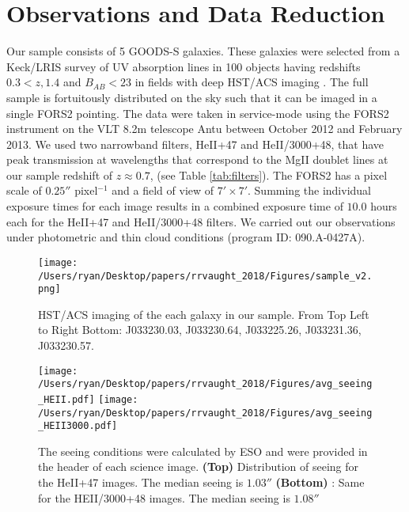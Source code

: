 \documentclass[twocolumn]{aastex6}
\begin{document}
\section{Observations and Data Reduction}
Our sample consists of 5 GOODS-S galaxies. These galaxies were selected from a Keck/LRIS survey of UV absorption lines in 100 objects having redshifts $0.3< z , 1.4$ and $B_{AB}< 23$ in fields with deep HST/ACS imaging \cite{Rubin_2014}. 
%
The full sample is fortuitously distributed on the sky such that it can be imaged in a single FORS2 pointing.
The data were taken in service-mode using the FORS2 instrument on the VLT 8.2m telescope Antu between October 2012 and February 2013. 
%
We used two narrowband filters, HeII+47 and HeII/3000+48, that have peak transmission at wavelengths that correspond to the MgII doublet lines at our sample redshift of $z\approx 0.7$, (see Table \ref{tab:filters}).
%
The FORS2 has a pixel scale of $0.25''$ pixel$^{-1}$ and a field of view of $7'\times7'$.
%
Summing the individual exposure times for each image results in a combined exposure time of $10.0$ hours each for the HeII+47 and HeII/3000+48 filters.
%
We carried out our observations under photometric and thin cloud conditions (program ID: 090.A-0427A).

\begin{figure}[!h]
\centering
\texttt{[image: /Users/ryan/Desktop/papers/rrvaught\_2018/Figures/sample\_v2.png]}
\caption{HST/ACS imaging of the each galaxy in our sample. From Top Left to Right Bottom: J033230.03, J033230.64, J033225.26, J033231.36, J033230.57.}
\end{figure}



\begin{figure}[h]
\centering
\texttt{[image: /Users/ryan/Desktop/papers/rrvaught\_2018/Figures/avg\_seeing\_HEII.pdf]}
\texttt{[image: /Users/ryan/Desktop/papers/rrvaught\_2018/Figures/avg\_seeing\_HEII3000.pdf]}
\caption{ The seeing conditions were calculated by ESO and were provided in the header of each science image. \textbf{(Top)} Distribution of seeing for the HeII+47 images. The median seeing is $1.03''$ \textbf{(Bottom)} : Same for the HEII/3000+48 images. The median seeing is $1.08''$ }
\end{figure}
\end{document}
